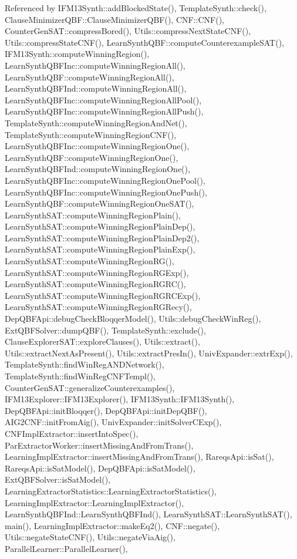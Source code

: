 Referenced by I\-F\-M13\-Synth\-::add\-Blocked\-State(), Template\-Synth\-::check(), Clause\-Minimizer\-Q\-B\-F\-::\-Clause\-Minimizer\-Q\-B\-F(), C\-N\-F\-::\-C\-N\-F(), Counter\-Gen\-S\-A\-T\-::compress\-Bored(), Utils\-::compress\-Next\-State\-C\-N\-F(), Utils\-::compress\-State\-C\-N\-F(), Learn\-Synth\-Q\-B\-F\-::compute\-Counterexample\-S\-A\-T(), I\-F\-M13\-Synth\-::compute\-Winning\-Region(), Learn\-Synth\-Q\-B\-F\-Inc\-::compute\-Winning\-Region\-All(), Learn\-Synth\-Q\-B\-F\-::compute\-Winning\-Region\-All(), Learn\-Synth\-Q\-B\-F\-Ind\-::compute\-Winning\-Region\-All(), Learn\-Synth\-Q\-B\-F\-Inc\-::compute\-Winning\-Region\-All\-Pool(), Learn\-Synth\-Q\-B\-F\-Inc\-::compute\-Winning\-Region\-All\-Push(), Template\-Synth\-::compute\-Winning\-Region\-And\-Net(), Template\-Synth\-::compute\-Winning\-Region\-C\-N\-F(), Learn\-Synth\-Q\-B\-F\-Inc\-::compute\-Winning\-Region\-One(), Learn\-Synth\-Q\-B\-F\-::compute\-Winning\-Region\-One(), Learn\-Synth\-Q\-B\-F\-Ind\-::compute\-Winning\-Region\-One(), Learn\-Synth\-Q\-B\-F\-Inc\-::compute\-Winning\-Region\-One\-Pool(), Learn\-Synth\-Q\-B\-F\-Inc\-::compute\-Winning\-Region\-One\-Push(), Learn\-Synth\-Q\-B\-F\-::compute\-Winning\-Region\-One\-S\-A\-T(), Learn\-Synth\-S\-A\-T\-::compute\-Winning\-Region\-Plain(), Learn\-Synth\-S\-A\-T\-::compute\-Winning\-Region\-Plain\-Dep(), Learn\-Synth\-S\-A\-T\-::compute\-Winning\-Region\-Plain\-Dep2(), Learn\-Synth\-S\-A\-T\-::compute\-Winning\-Region\-Plain\-Exp(), Learn\-Synth\-S\-A\-T\-::compute\-Winning\-Region\-R\-G(), Learn\-Synth\-S\-A\-T\-::compute\-Winning\-Region\-R\-G\-Exp(), Learn\-Synth\-S\-A\-T\-::compute\-Winning\-Region\-R\-G\-R\-C(), Learn\-Synth\-S\-A\-T\-::compute\-Winning\-Region\-R\-G\-R\-C\-Exp(), Learn\-Synth\-S\-A\-T\-::compute\-Winning\-Region\-R\-G\-Recy(), Dep\-Q\-B\-F\-Api\-::debug\-Check\-Bloqqer\-Model(), Utils\-::debug\-Check\-Win\-Reg(), Ext\-Q\-B\-F\-Solver\-::dump\-Q\-B\-F(), Template\-Synth\-::exclude(), Clause\-Explorer\-S\-A\-T\-::explore\-Clauses(), Utils\-::extract(), Utils\-::extract\-Next\-As\-Present(), Utils\-::extract\-Pres\-In(), Univ\-Expander\-::extr\-Exp(), Template\-Synth\-::find\-Win\-Reg\-A\-N\-D\-Network(), Template\-Synth\-::find\-Win\-Reg\-C\-N\-F\-Templ(), Counter\-Gen\-S\-A\-T\-::generalize\-Counterexamples(), I\-F\-M13\-Explorer\-::\-I\-F\-M13\-Explorer(), I\-F\-M13\-Synth\-::\-I\-F\-M13\-Synth(), Dep\-Q\-B\-F\-Api\-::init\-Bloqqer(), Dep\-Q\-B\-F\-Api\-::init\-Dep\-Q\-B\-F(), A\-I\-G2\-C\-N\-F\-::init\-From\-Aig(), Univ\-Expander\-::init\-Solver\-C\-Exp(), C\-N\-F\-Impl\-Extractor\-::insert\-Into\-Spec(), Par\-Extractor\-Worker\-::insert\-Missing\-And\-From\-Trans(), Learning\-Impl\-Extractor\-::insert\-Missing\-And\-From\-Trans(), Rareqs\-Api\-::is\-Sat(), Rareqs\-Api\-::is\-Sat\-Model(), Dep\-Q\-B\-F\-Api\-::is\-Sat\-Model(), Ext\-Q\-B\-F\-Solver\-::is\-Sat\-Model(), Learning\-Extractor\-Statistics\-::\-Learning\-Extractor\-Statistics(), Learning\-Impl\-Extractor\-::\-Learning\-Impl\-Extractor(), Learn\-Synth\-Q\-B\-F\-Ind\-::\-Learn\-Synth\-Q\-B\-F\-Ind(), Learn\-Synth\-S\-A\-T\-::\-Learn\-Synth\-S\-A\-T(), main(), Learning\-Impl\-Extractor\-::make\-Eq2(), C\-N\-F\-::negate(), Utils\-::negate\-State\-C\-N\-F(), Utils\-::negate\-Via\-Aig(), Parallel\-Learner\-::\-Parallel\-Learner(), 